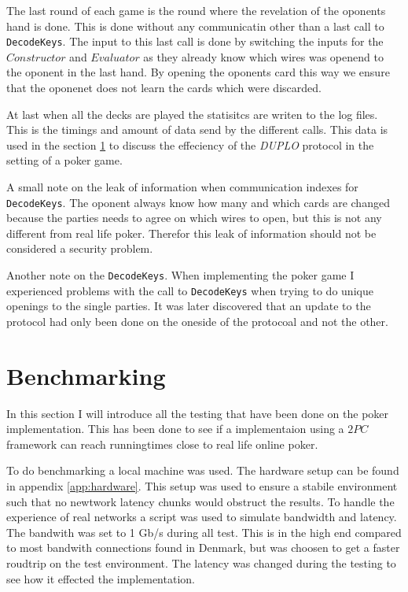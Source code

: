 \documentclass[twoside,11pt,openright]{report}
\newcommand{\DUPLO}{\textit{DUPLO} }
\begin{document}
The last round of each game is the round where the revelation of the oponents hand is done. This is done without any communicatin other than a last call to \verb|DecodeKeys|. The input to this last call is done by switching the inputs for the $Constructor$ and $Evaluator$ as they already know which wires was openend to the oponent in the last hand. By opening the oponents card this way we ensure that the oponenet does not learn the cards which were discarded.

At last when all the decks are played the statisitcs are writen to the log files. This is the timings and amount of data send by the different calls. This data is used in the section \ref{sec:bechmarking} to discuss the effeciency of the \DUPLO protocol in the setting of a poker game.

\bigskip

A small note on the leak of information when communication indexes for \verb|DecodeKeys|. The oponent always know how many and which cards are changed because the parties needs to agree on which wires to open, but this is not any different from real life poker. Therefor this leak of information should not be considered a security problem.

\bigskip

Another note on the \verb|DecodeKeys|. When implementing the poker game I experienced problems with the call to \verb|DecodeKeys| when trying to do unique openings to the single parties. It was later discovered that an update to the protocol had only been done on the oneside of the protocoal and not the other.


\section{Benchmarking}
\label{sec:bechmarking}

In this section I will introduce all the testing that have been done on the poker implementation. This has been done to see if a implementaion using a $2PC$ framework can reach runningtimes close to real life online poker.

To do benchmarking a local machine was used. The hardware setup can be found in appendix \ref{app:hardware}. This setup was used to ensure a stabile environment such that no newtwork latency chunks would obstruct the results. To handle the experience of real networks a script was used to simulate bandwidth and latency. The bandwith was set to 1 Gb/s during all test. This is in the high end compared to most bandwith connections found in Denmark, but was choosen to get a faster roudtrip on the test environment. The latency was changed during the testing to see how it effected the implementation.
\end{document}
